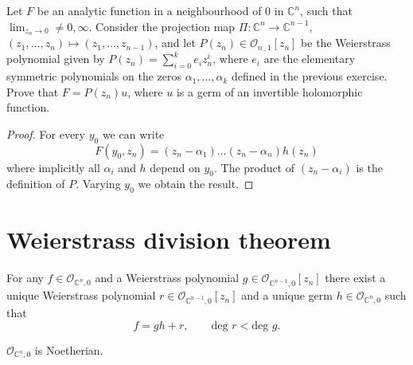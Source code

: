 \begin{exercise}
\label{exercise-weier-prepa-theor}
Let $F$ be an analytic function in a
neighbourhood of $0$ in $\mathbb{C}^n$,
such that $\lim_{z_n\to 0}\neq 0,\infty$.
Consider the projection map
$\Pi:\mathbb{C}^n\to\mathbb{C}^{n-1}$,
$(z_1,\ldots,z_n)\mapsto(z_1,\ldots,z_{n-1})
$,
and let
$P(z_n)\in \mathcal{O}_{n_-1}[z_n]$ be the
Weierstrass polynomial given by
$P(z_n)=\sum_{i=0}^ke_iz_n^i$, where $e_i$
are the elementary symmetric
polynomials on the zeros
$\alpha_1,\ldots,\alpha_k$ defined in the
previous
exercise. Prove that $F=P(z_n)u$, where $u$
is a germ of an invertible
holomorphic function.
\end{exercise}

\begin{proof}
For every $y_0$ we can write
$$
F(y_0,z_n)=(z_n-\alpha_1)\ldots(z_n-\alpha_n)
h(z_n)
$$
where implicitly all $\alpha_i$ and $h$
depend on $y_0$. The product of
$(z_n-\alpha_i)$ is the definition of $P$.
Varying $y_0$ we obtain the result.
\end{proof}

\section{Weierstrass division theorem}
\label{section-weierstrass-division-theorem}

\begin{theorem}
\label{theorem-weierstrass-division-theorem}
For any $f \in \mathcal{O}_{\mathbb{C}^n,0}$
and
a Weierstrass polynomial $g \in
\mathcal{O}_{\mathbb{C}^{n-1},0}[z_n]$
there exist a unique Weierstrass polynomial
$r \in \mathcal{O}_{\mathbb{C}^{n-1},0}[z_n]$
and a unique germ $h \in
\mathcal{O}_{\mathbb{C}^n,0}$
such that
$$
f=gh+r,\qquad \text{deg }r < \text{deg }g.
$$
\end{theorem}

\begin{proposition}
\label{proposition-stalk-is-noetherian}
$\mathcal{O}_{\mathbb{C}^n,0}$ is Noetherian.
\end{proposition}

